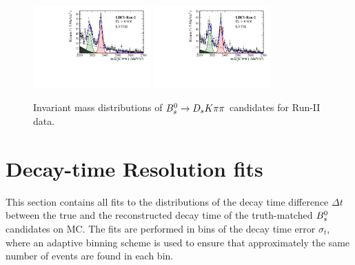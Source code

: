 \begin{figure}[h]
\includegraphics[height=!,width=0.4\textwidth]{figs/MassFit/signal_Run2_pipipi_t0.pdf}
\includegraphics[height=!,width=0.4\textwidth]{figs/MassFit/signal_Run2_pipipi_t1.pdf}

\caption{Invariant mass distributions of ${{B}^0_{s}}\rightarrow{\ensuremath{{D}_{s}}} K{\pi}{\pi}$ candidates for Run-II data.}
\label{fig:massfits_signal_Run2}
\end{figure}


\clearpage
\section{Decay-time Resolution fits}
\label{sec:DecResFits}

\setcounter{figure}{0}
\setcounter{table}{0}

\renewcommand{\thefigure}{C.\arabic{figure}}

This section contains all fits to the distributions of the decay time difference $\Delta t$ between the true and the reconstructed decay time of the truth-matched ${{B}^0_{s}}$ candidates on MC.
The fits are performed in bins of the decay time error $\sigma_{t}$, where an adaptive binning scheme is used to ensure that approximately the same number of events are found in each bin. 

